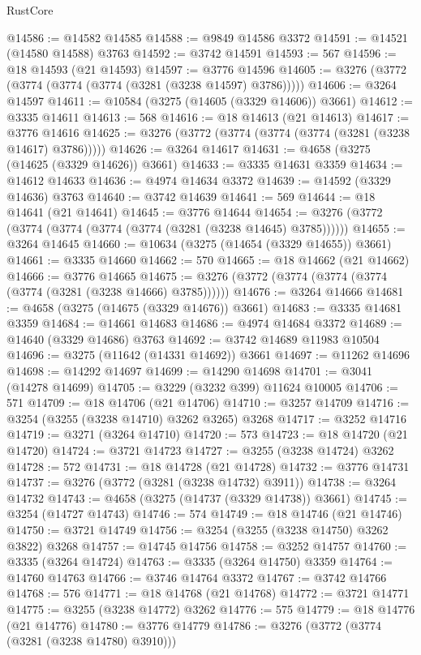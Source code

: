 \begin{lexlean}{RustCore}
\begin{coremodule}
@14586 := @14582 @14585
@14588 := @9849 @14586 @3372
@14591 := @14521 (@14580 @14588) @3763
@14592 := @3742 @14591
@14593 := 567
@14596 := @18 @14593 (@21 @14593)
@14597 := @3776 @14596
@14605 := @3276 (@3772 (@3774 (@3774 (@3774 (@3281 (@3238 @14597) @3786)))))
@14606 := @3264 @14597
@14611 := @10584 (@3275 (@14605 (@3329 @14606)) @3661)
@14612 := @3335 @14611
@14613 := 568
@14616 := @18 @14613 (@21 @14613)
@14617 := @3776 @14616
@14625 := @3276 (@3772 (@3774 (@3774 (@3774 (@3281 (@3238 @14617) @3786)))))
@14626 := @3264 @14617
@14631 := @4658 (@3275 (@14625 (@3329 @14626)) @3661)
@14633 := @3335 @14631 @3359
@14634 := @14612 @14633
@14636 := @4974 @14634 @3372
@14639 := @14592 (@3329 @14636) @3763
@14640 := @3742 @14639
@14641 := 569
@14644 := @18 @14641 (@21 @14641)
@14645 := @3776 @14644
@14654 := @3276 (@3772 (@3774 (@3774 (@3774 (@3774 (@3281 (@3238 @14645) @3785))))))
@14655 := @3264 @14645
@14660 := @10634 (@3275 (@14654 (@3329 @14655)) @3661)
@14661 := @3335 @14660
@14662 := 570
@14665 := @18 @14662 (@21 @14662)
@14666 := @3776 @14665
@14675 := @3276 (@3772 (@3774 (@3774 (@3774 (@3774 (@3281 (@3238 @14666) @3785))))))
@14676 := @3264 @14666
@14681 := @4658 (@3275 (@14675 (@3329 @14676)) @3661)
@14683 := @3335 @14681 @3359
@14684 := @14661 @14683
@14686 := @4974 @14684 @3372
@14689 := @14640 (@3329 @14686) @3763
@14692 := @3742 @14689 @11983 @10504
@14696 := @3275 (@11642 (@14331 @14692)) @3661
@14697 := @11262 @14696
@14698 := @14292 @14697
@14699 := @14290 @14698
@14701 := @3041 (@14278 @14699)
@14705 := @3229 (@3232 @399) @11624 @10005
@14706 := 571
@14709 := @18 @14706 (@21 @14706)
@14710 := @3257 @14709
@14716 := @3254 (@3255 (@3238 @14710) @3262 @3265) @3268
@14717 := @3252 @14716
@14719 := @3271 (@3264 @14710)
@14720 := 573
@14723 := @18 @14720 (@21 @14720)
@14724 := @3721 @14723
@14727 := @3255 (@3238 @14724) @3262
@14728 := 572
@14731 := @18 @14728 (@21 @14728)
@14732 := @3776 @14731
@14737 := @3276 (@3772 (@3281 (@3238 @14732) @3911))
@14738 := @3264 @14732
@14743 := @4658 (@3275 (@14737 (@3329 @14738)) @3661)
@14745 := @3254 (@14727 @14743)
@14746 := 574
@14749 := @18 @14746 (@21 @14746)
@14750 := @3721 @14749
@14756 := @3254 (@3255 (@3238 @14750) @3262 @3822) @3268
@14757 := @14745 @14756
@14758 := @3252 @14757
@14760 := @3335 (@3264 @14724)
@14763 := @3335 (@3264 @14750) @3359
@14764 := @14760 @14763
@14766 := @3746 @14764 @3372
@14767 := @3742 @14766
@14768 := 576
@14771 := @18 @14768 (@21 @14768)
@14772 := @3721 @14771
@14775 := @3255 (@3238 @14772) @3262
@14776 := 575
@14779 := @18 @14776 (@21 @14776)
@14780 := @3776 @14779
@14786 := @3276 (@3772 (@3774 (@3281 (@3238 @14780) @3910)))

\end{coremodule}
\end{lexlean}

